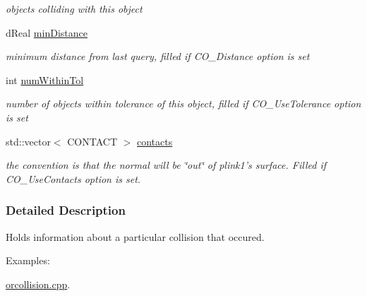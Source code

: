 \begin{DoxyCompactItemize}
\begin{DoxyCompactList}\small\item\em objects colliding with this object \item\end{DoxyCompactList}\item 
\hypertarget{classOpenRAVE_1_1CollisionReport_a39ecee22e3be662c17e9c9d28215dd66}{
dReal \hyperlink{classOpenRAVE_1_1CollisionReport_a39ecee22e3be662c17e9c9d28215dd66}{minDistance}}
\label{classOpenRAVE_1_1CollisionReport_a39ecee22e3be662c17e9c9d28215dd66}

\begin{DoxyCompactList}\small\item\em minimum distance from last query, filled if CO\_\-Distance option is set \item\end{DoxyCompactList}\item 
\hypertarget{classOpenRAVE_1_1CollisionReport_a04fc6ba3cfd80183ace93d10661cf32f}{
int \hyperlink{classOpenRAVE_1_1CollisionReport_a04fc6ba3cfd80183ace93d10661cf32f}{numWithinTol}}
\label{classOpenRAVE_1_1CollisionReport_a04fc6ba3cfd80183ace93d10661cf32f}

\begin{DoxyCompactList}\small\item\em number of objects within tolerance of this object, filled if CO\_\-UseTolerance option is set \item\end{DoxyCompactList}\item 
\hypertarget{classOpenRAVE_1_1CollisionReport_afd310727fc8474b0057786fadf2088df}{
std::vector$<$ CONTACT $>$ \hyperlink{classOpenRAVE_1_1CollisionReport_afd310727fc8474b0057786fadf2088df}{contacts}}
\label{classOpenRAVE_1_1CollisionReport_afd310727fc8474b0057786fadf2088df}

\begin{DoxyCompactList}\small\item\em the convention is that the normal will be \char`\"{}out\char`\"{} of plink1's surface. Filled if CO\_\-UseContacts option is set. \item\end{DoxyCompactList}\end{DoxyCompactItemize}


\subsubsection{Detailed Description}
Holds information about a particular collision that occured. \begin{Desc}
\item[Examples: ]\par


\hyperlink{orcollision_8cpp-example}{orcollision.cpp}.

\end{Desc}

